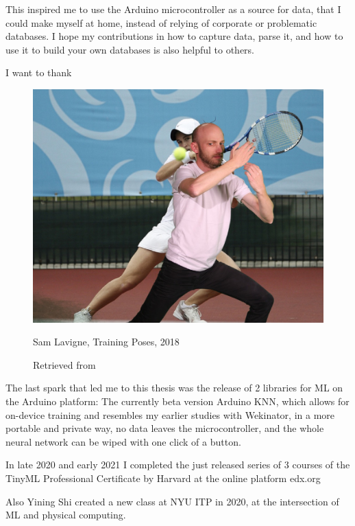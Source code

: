  This inspired me to use the Arduino microcontroller as a source for data, that I could make myself at home, instead of relying of corporate or problematic databases. I hope my contributions in how to capture data, parse it, and how to use it to build your own databases is also helpful to others.

I want to thank 

\begin{figure}[ht]
  \centering
    \includegraphics[width=0.75\linewidth,height=0.25\textheight,keepaspectratio]{images/sam-lavigne-training-poses.jpg}
  \caption{Sam Lavigne, Training Poses, 2018}
  \caption*{Retrieved from \cite{website-sam-lavigne-training-poses}}
  \label{fig:sam-lavigne-training-poses}
\end{figure}

The last spark that led me to this thesis was the release of 2 libraries for \acrshort{ML} on the Arduino platform: The currently beta version Arduino KNN, which allows for on-device training and resembles my earlier studies with Wekinator, in a more portable and private way, no data leaves the microcontroller, and the whole neural network can be wiped with one click of a button.

In late 2020 and early 2021 I completed the just released series of 3 courses of the TinyML Professional Certificate by Harvard at the online platform edx.org

Also Yining Shi created a new class at \acrshort{NYU} \acrshort{ITP} in 2020, at the intersection of \acrshort{ML} and physical computing.

\cite{website-arpillera-mirror}


